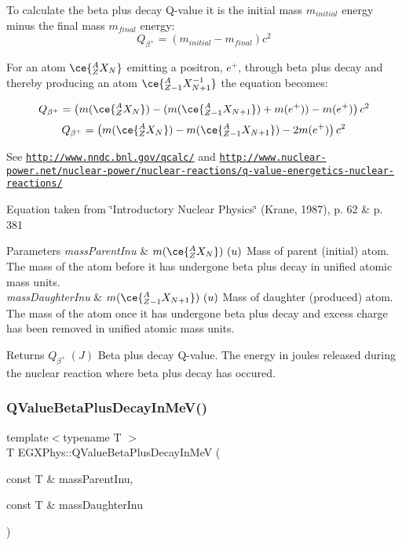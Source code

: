To calculate the beta plus decay Q-\/value it is the initial mass $m_{initial}$ energy minus the final mass $m_{final}$ energy\+: \[Q_{\beta^+} = \left ( m_{initial}-m_{final}\right ) c^2\]

For an atom $\ce{ ^{A}_{Z}X_{N} }$ emitting a positron, $e^+$, through beta plus decay and thereby producing an atom $\ce{ ^{A}_{Z{-1}}X^{-1}_{N{+1}} }$ the equation becomes\+:

\[Q_{\beta^+} = \left ( m(\ce{ ^{A}_{Z}X_{N} }) - (m(\ce{ ^{A}_{Z{-1}}X_{N{+1}} }) + m(e^+)) - m(e^+)\right ) c^2\] \[Q_{\beta^+} = \left ( m(\ce{ ^{A}_{Z}X_{N} }) - m(\ce{ ^{A}_{Z{-1}}X_{N{+1}} }) - 2m(e^+)\right ) c^2\]

See \href{http://www.nndc.bnl.gov/qcalc/}{\tt http\+://www.\+nndc.\+bnl.\+gov/qcalc/} and \href{http://www.nuclear-power.net/nuclear-power/nuclear-reactions/q-value-energetics-nuclear-reactions/}{\tt http\+://www.\+nuclear-\/power.\+net/nuclear-\/power/nuclear-\/reactions/q-\/value-\/energetics-\/nuclear-\/reactions/}

Equation taken from \char`\"{}\+Introductory Nuclear Physics\char`\"{} (Krane, 1987), p. 62 \& p. 381


\begin{DoxyParams}{Parameters}
{\em mass\+Parent\+Inu} & $m(\ce{ ^{A}_{Z}X_{N} })\ (u)$ Mass of parent (initial) atom. The mass of the atom before it has undergone beta plus decay in unified atomic mass units. \\
\hline
{\em mass\+Daughter\+Inu} & $m(\ce{ ^{A}_{Z{-1}}X_{N{+1}} })\ (u)$ Mass of daughter (produced) atom. The mass of the atom once it has undergone beta plus decay and excess charge has been removed in unified atomic mass units. \\
\hline
\end{DoxyParams}
\begin{DoxyReturn}{Returns}
$Q_{\beta^+}\ (J)$ Beta plus decay Q-\/value. The energy in joules released during the nuclear reaction where beta plus decay has occured. 
\end{DoxyReturn}
\mbox{\label{group___e_g_x_phys-_q_value_ga9bf549cd4f8e1c76e9cc41b72d4f0279}} 
\subsubsection{\texorpdfstring{Q\+Value\+Beta\+Plus\+Decay\+In\+Me\+V()}{QValueBetaPlusDecayInMeV()}}
{\footnotesize\ttfamily template$<$typename T $>$ \\
T E\+G\+X\+Phys\+::\+Q\+Value\+Beta\+Plus\+Decay\+In\+MeV (\begin{DoxyParamCaption}\item[{const T \&}]{mass\+Parent\+Inu,  }\item[{const T \&}]{mass\+Daughter\+Inu }\end{DoxyParamCaption})}



